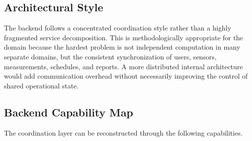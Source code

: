 \documentclass[11pt,a4paper]{article}
\begin{document}
\subsection{Architectural Style}
The backend follows a concentrated coordination style rather than a highly fragmented service decomposition. This is methodologically appropriate for the domain because the hardest problem is not independent computation in many separate domains, but the consistent synchronization of users, sensors, measurements, schedules, and reports. A more distributed internal architecture would add communication overhead without necessarily improving the control of shared operational state.

\subsection{Backend Capability Map}
The coordination layer can be reconstructed through the following capabilities.
\end{document}
